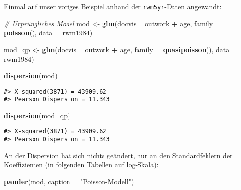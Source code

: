 \documentclass[ngerman,a4paper,]{scrartcl}
\newenvironment{Shaded}{\begin{snugshade}}{\end{snugshade}}
\newcommand{\CommentTok}[1]{\textcolor[rgb]{0.56,0.35,0.01}{\textit{#1}}}
\newcommand{\DataTypeTok}[1]{\textcolor[rgb]{0.13,0.29,0.53}{#1}}
\newcommand{\KeywordTok}[1]{\textcolor[rgb]{0.13,0.29,0.53}{\textbf{#1}}}
\newcommand{\NormalTok}[1]{#1}
\newcommand{\OperatorTok}[1]{\textcolor[rgb]{0.81,0.36,0.00}{\textbf{#1}}}
\newcommand{\StringTok}[1]{\textcolor[rgb]{0.31,0.60,0.02}{#1}}
\theoremstyle{definition}
\theoremstyle{definition}
\theoremstyle{definition}
\theoremstyle{remark}
\begin{document}
Einmal auf unser voriges Beispiel anhand der \texttt{rwm5yr}-Daten angewandt:

\begin{Shaded}
\begin{Highlighting}[]
\CommentTok{# Urprüngliches Model}
\NormalTok{mod <-}\StringTok{ }\KeywordTok{glm}\NormalTok{(docvis }\OperatorTok{~}\StringTok{ }\NormalTok{outwork }\OperatorTok{+}\StringTok{ }\NormalTok{age, }\DataTypeTok{family =} \KeywordTok{poisson}\NormalTok{(), }\DataTypeTok{data =}\NormalTok{ rwm1984)}

\NormalTok{mod_qp <-}\StringTok{ }\KeywordTok{glm}\NormalTok{(docvis }\OperatorTok{~}\StringTok{ }\NormalTok{outwork }\OperatorTok{+}\StringTok{ }\NormalTok{age, }\DataTypeTok{family =} \KeywordTok{quasipoisson}\NormalTok{(), }\DataTypeTok{data =}\NormalTok{ rwm1984)}

\KeywordTok{dispersion}\NormalTok{(mod)}
\end{Highlighting}
\end{Shaded}

\begin{verbatim}
#> X-squared(3871) = 43909.62
#> Pearson Dispersion = 11.343
\end{verbatim}

\begin{Shaded}
\begin{Highlighting}[]
\KeywordTok{dispersion}\NormalTok{(mod_qp)}
\end{Highlighting}
\end{Shaded}

\begin{verbatim}
#> X-squared(3871) = 43909.62
#> Pearson Dispersion = 11.343
\end{verbatim}

An der Dispersion hat sich nichts geändert, nur an den Standardfehlern der Koeffizienten (in folgenden Tabellen auf log-Skala):

\begin{Shaded}
\begin{Highlighting}[]
\KeywordTok{pander}\NormalTok{(mod, }\DataTypeTok{caption =} \StringTok{"Poisson-Modell"}\NormalTok{)}
\end{Highlighting}
\end{Shaded}
\end{document}
